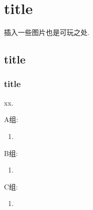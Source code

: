 


\chapter{title}

插入一些图片也是可玩之处. 

\section{title}



\subsection{title}
\zsd xx. 



A组: 
\begin{enumerate}
\item 

\end{enumerate}


B组: 
\begin{enumerate}
\item 

\end{enumerate}


C组: 
\begin{enumerate}
\item 

\end{enumerate}